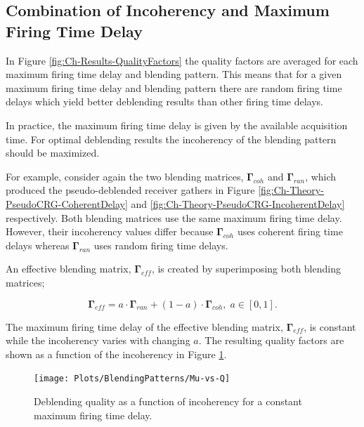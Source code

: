 			
				
\subsection*{Combination of Incoherency and Maximum Firing Time Delay}

In Figure \ref{fig:Ch-Results-QualityFactors} the quality factors are averaged for each maximum firing time delay and blending pattern. This means that for a given maximum firing time delay and blending pattern there are random firing time delays which yield better deblending results than other firing time delays.

In practice, the maximum firing time delay is given by the available acquisition time. For optimal deblending results the incoherency of the blending pattern should be maximized.

For example, consider again the two blending matrices, $\mathbf{\Gamma}_{coh}$ and $\mathbf{\Gamma}_{ran}$, which produced the pseudo-deblended receiver gathers in Figure \ref{fig:Ch-Theory-PseudoCRG-CoherentDelay} and \ref{fig:Ch-Theory-PseudoCRG-IncoherentDelay} respectively. Both blending matrices use the same maximum firing time delay. However, their incoherency values differ because $\mathbf{\Gamma}_{coh}$ uses coherent firing time delays whereas $\mathbf{\Gamma}_{ran}$ uses random firing time delays. 

An effective blending matrix, $\mathbf{\Gamma}_{eff}$, is created by superimposing both blending matrices;

\begin{equation}
	\mathbf{\Gamma}_{eff} = a \cdot \mathbf{\Gamma}_{ran} + (1 - a) \cdot \mathbf{\Gamma}_{coh}, \; a \in [0,1].
	\label{eq:Ch-Incoherency-EffectiveG}
\end{equation}


The maximum firing time delay of the effective blending matrix, $\mathbf{\Gamma}_{eff}$, is constant while the incoherency  varies with changing $a$. The resulting quality factors are shown as a function of the incoherency in Figure \ref{fig:Ch-Results-Quality-vs-Incoherency}.

\begin{figure}
	\centering
	\texttt{[image: Plots/BlendingPatterns/Mu-vs-Q]}
	\caption{Deblending quality as a function of incoherency for a constant maximum firing time delay.}
	\label{fig:Ch-Results-Quality-vs-Incoherency}
\end{figure}




























